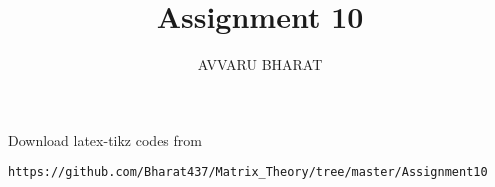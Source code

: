 \documentclass[journal,12pt,twocolumn]{IEEEtran}
\DeclareMathOperator*{\Res}{Res}
\begin{document}
\newtheorem{theorem}{Theorem}[section]
\newtheorem{problem}{Problem}
\newtheorem{proposition}{Proposition}[section]
\newtheorem{lemma}{Lemma}[section]
\newtheorem{corollary}[theorem]{Corollary}
\newtheorem{example}{Example}[section]
\newtheorem{definition}[problem]{Definition}

\newcommand{\BEQA}{\begin{eqnarray}}
\newcommand{\EEQA}{\end{eqnarray}}
\newcommand{\define}{\stackrel{\triangle}{=}}

\providecommand{\mbf}{\mathbf}
\providecommand{\pr}[1]{\ensuremath{\Pr\left(#1\right)}}
\providecommand{\qfunc}[1]{\ensuremath{Q\left(#1\right)}}
\providecommand{\sbrak}[1]{\ensuremath{{}\left[#1\right]}}
\providecommand{\lsbrak}[1]{\ensuremath{{}\left[#1\right.}}
\providecommand{\rsbrak}[1]{\ensuremath{{}\left.#1\right]}}
\providecommand{\brak}[1]{\ensuremath{\left(#1\right)}}
\providecommand{\lbrak}[1]{\ensuremath{\left(#1\right.}}
\providecommand{\rbrak}[1]{\ensuremath{\left.#1\right)}}
\providecommand{\cbrak}[1]{\ensuremath{\left\{#1\right\}}}
\providecommand{\lcbrak}[1]{\ensuremath{\left\{#1\right.}}
\providecommand{\rcbrak}[1]{\ensuremath{\left.#1\right\}}}
\theoremstyle{remark}
\newtheorem{rem}{Remark}
\newcommand{\sgn}{\mathop{\mathrm{sgn}}}
\providecommand{\abs}[1]{\left\vert#1\right\vert}
\providecommand{\res}[1]{\Res\displaylimits_{#1}} 
\providecommand{\norm}[1]{\left\lVert#1\right\rVert}
\providecommand{\mtx}[1]{\mathbf{#1}}
\providecommand{\mean}[1]{E\left[ #1 \right]}
\providecommand{\fourier}{\overset{\mathcal{F}}{ \rightleftharpoons}}
\providecommand{\system}{\overset{\mathcal{H}}{ \longleftrightarrow}}
\newcommand{\solution}{\noindent \textbf{Solution: }}
\newcommand{\cosec}{\,\text{cosec}\,}
\providecommand{\dec}[2]{\ensuremath{\overset{#1}{\underset{#2}{\gtrless}}}}
\newcommand{\myvec}[1]{\ensuremath{\begin{pmatrix}#1\end{pmatrix}}}
\newcommand{\mydet}[1]{\ensuremath{\begin{vmatrix}#1\end{vmatrix}}}
\makeatletter
{}
\makeatother
\let\StandardTheFigure\thefigure
\let\vec\mathbf
\renewcommand{\thefigure}{\theproblem}
\def\putbox#1#2#3{\makebox[0in][l]{\makebox[#1][l]{}\raisebox{\baselineskip}[0in][0in]{\raisebox{#2}[0in][0in]{#3}}}}
     \def\rightbox#1{\makebox[0in][r]{#1}}
     \def\centbox#1{\makebox[0in]{#1}}
     \def\topbox#1{\raisebox{-\baselineskip}[0in][0in]{#1}}
     \def\midbox#1{\raisebox{-0.5\baselineskip}[0in][0in]{#1}}
\vspace{3cm}
\title{Assignment 10}
\author{AVVARU BHARAT}
\maketitle
\newpage
\bigskip
\renewcommand{\thefigure}{\theenumi}
\renewcommand{\thetable}{\theenumi}
Download latex-tikz codes from 
%
\begin{lstlisting}
https://github.com/Bharat437/Matrix_Theory/tree/master/Assignment10
\end{lstlisting}
%
\end{document}
